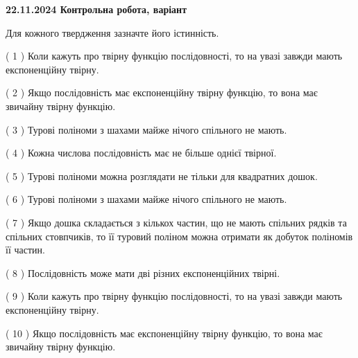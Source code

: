 \documentclass[12pt, ukrainian]{article}
\begin{document}
\vspace{4mm}
\newpage
\begin {large}

\textbf{22.11.2024 Контрольна робота, варіант  }\par


{
Для кожного твердження зазначте його істинність.\par
\vspace{2mm}
( 1 ) Коли кажуть про твірну функцію послідовності, то на увазі завжди мають експоненційну твірну.%

( 2 ) Якщо послідовність має експоненційну твірну функцію, то вона має звичайну твірну функцію.%

( 3 ) Турові поліноми з шахами майже нічого спільного не мають.%

( 4 ) Кожна числова послідовність має не більше однієї твірної.%

( 5 ) Турові поліноми можна розглядати не тільки для квадратних дошок.%

( 6 ) Турові поліноми з шахами майже нічого спільного не мають.%

( 7 ) Якщо дошка складається з кількох частин, що не мають спільних рядків та спільних стовпчиків, то її туровий поліном можна отримати як добуток поліномів її частин.%

( 8 ) Послідовність може мати дві різних експоненційних твірні.%

( 9 ) Коли кажуть про твірну функцію послідовності, то на увазі завжди мають експоненційну твірну.%

( 10 ) Якщо послідовність має експоненційну твірну функцію, то вона має звичайну твірну функцію.%


\vspace{5mm}
}
\end {large}
\end{document}
